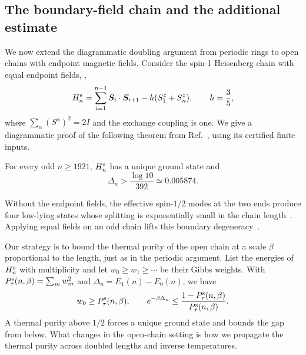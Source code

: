
\subsection{The boundary-field chain and the additional estimate}
\label{obc:setup}

We now extend the diagrammatic doubling argument from periodic rings
to open chains with endpoint magnetic fields. Consider the spin-1
Heisenberg chain with equal endpoint fields, \fieldsame,
\begin{equation}
 H_n^{\mathrm{s}}
 =\sum_{i=1}^{n-1}\bm S_i\cdot\bm S_{i+1}
 -h(S_1^z+S_n^z),\qquad h=\frac35,
 \label{obc:model}
\end{equation}
where $\sum_\alpha(S^\alpha)^2=2I$ and the exchange coupling is one.
We give a diagrammatic proof of the following theorem from
Ref.~\cite{OpenAI2026Boundaryfield}, using its certified finite inputs.

\begin{theorem}
\label{obc:theorem}
For every odd $n\ge1921$, $H_n^{\mathrm{s}}$ has a unique ground state and
\[
 \Delta_n>\frac{\log 10}{392}\simeq0.005874.
\]
\end{theorem}

Without the endpoint fields, the effective spin-$1/2$ modes at the
two ends produce four low-lying states whose splitting is exponentially
small in the chain length~\cite{Kennedy1990Exact}. Applying equal fields on an odd chain lifts this
boundary degeneracy~\cite{OpenAI2026Boundaryfield}.

Our strategy is to bound the thermal purity of the open chain at a
scale $\beta$ proportional to the length, just as in the periodic
argument. List the energies of $H_n^{\mathrm{s}}$ with multiplicity and let $w_0\ge w_1\ge\cdots$
be their Gibbs weights. With
$P_{\tau}^{\mathrm{s}}(n,\beta)=\sum_m w_m^2$ and
$\Delta_n=E_1(n)-E_0(n)$, we have
\begin{equation}
 w_0\ge P_{\tau}^{\mathrm{s}}(n,\beta),\qquad
 e^{-\beta\Delta_n}
 \le\frac{1-P_{\tau}^{\mathrm{s}}(n,\beta)}{P_{\tau}^{\mathrm{s}}(n,\beta)}.
 \label{obc:target}
\end{equation}
A thermal purity above $1/2$ forces a unique ground state and bounds the
gap from below. What changes in the open-chain setting is how we
propagate the thermal purity across doubled lengths and inverse
temperatures.

